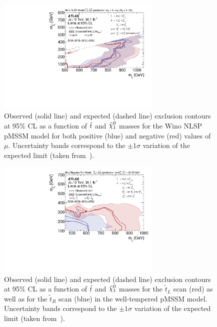 			\begin{figure}[htpb]
			  \begin{center}
			    \includegraphics[width=0.7\textwidth]{figures/fit/SRABCD_winoNLSP.pdf}
			    \caption{Observed (solid line) and expected (dashed line) exclusion contours at 95\% CL as a function of $\tilde{t}$ and $\ninoone$ masses for the Wino NLSP pMSSM model for both positive (blue) and negative (red) values of $\mu$. Uncertainty bands correspond to the $\pm 1 \sigma$ variation of the expected limit (taken from~\cite{stop0L}).}
			    \label{fig:winoNLSP_exclusion}
			  \end{center}
			\end{figure}

			\begin{figure}[htpb]
			  \begin{center}
			    \includegraphics[width=0.7\textwidth]{figures/fit/SRABCD_wellTempered.pdf}
			    \caption{Observed (solid line) and expected (dashed line) exclusion contours at 95\% CL as a function of $\tilde{t}$ and $\ninoone$ masses for the $\tilde t_{L}$ scan (red) as well as for the $\tilde t_{R}$ scan (blue) in the well-tempered pMSSM model. Uncertainty bands correspond to the $\pm 1 \sigma$ variation of the expected limit (taken from~\cite{stop0L}).} 
			    \label{fig:wellTemp_exclusion}
			  \end{center}
			\end{figure}

